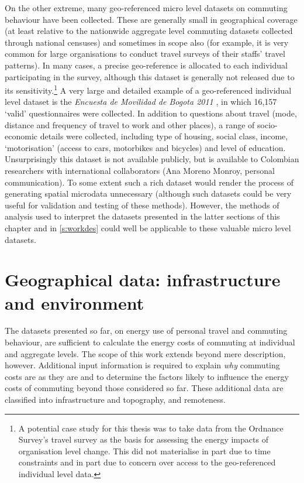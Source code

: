 \documentclass[a4paper, 11pt, twoside]{Thesis}
\begin{document}
On the other extreme, many geo-referenced micro level datasets on
commuting behaviour have been collected. These are generally small in geographical
coverage (at
least relative to the nationwide aggregate level commuting datasets
collected through national censuses) and sometimes in scope also (for example,
it is very common for large organisations to conduct travel surveys of their
staffs' travel patterns). In many cases, a precise geo-reference is allocated
to each individual participating in the survey, although this dataset is generally
not released due to its
sensitivity.\footnote{A
potential case study for this thesis was to take data from the Ordnance Survey's
travel survey as the basis for assessing the energy impacts of organisation level
change. This did not materialise in part due to time constraints and in part
due to concern over access to the geo-referenced individual level data.
}
A very large and detailed example of a geo-referenced individual level dataset
is the \emph{Encuesta de Movilidad de Bogota 2011} \citep{bogota2012}, in which 16,157 `valid'
questionnaires were collected. In addition to questions about travel
(mode, distance and frequency of travel to work and other places), a
range of socio-economic details were collected, including type of housing,
social class, income, `motorisation' (access to cars, motorbikes and bicycles)
and level of education. Unsurprisingly this dataset is not available publicly,
but is available to Colombian researchers with international collaborators
(Ana Moreno Monroy, personal communication). To some extent such a rich dataset
would render the process of generating spatial microdata unnecessary
(although such datasets could be very useful for validation and testing of
these methods). However, the methods of analysis used to interpret the
datasets presented in the latter sections of this chapter and in \cref{s:workdes}
could well be applicable to these valuable micro level datasets.

\section{Geographical data: infrastructure and environment} \label{sadditional}
The datasets presented so far, on energy use of personal travel and commuting
behaviour, are sufficient to calculate the energy costs of commuting at
individual and aggregate levels. The scope of this work extends beyond mere
description, however. Additional input information is required to explain \emph{why}
commuting costs are as they are and to determine the factors likely to
influence the energy costs of commuting beyond those considered so far. These
additional data are classified into infrastructure and topography,
and
remoteness.
\end{document}
